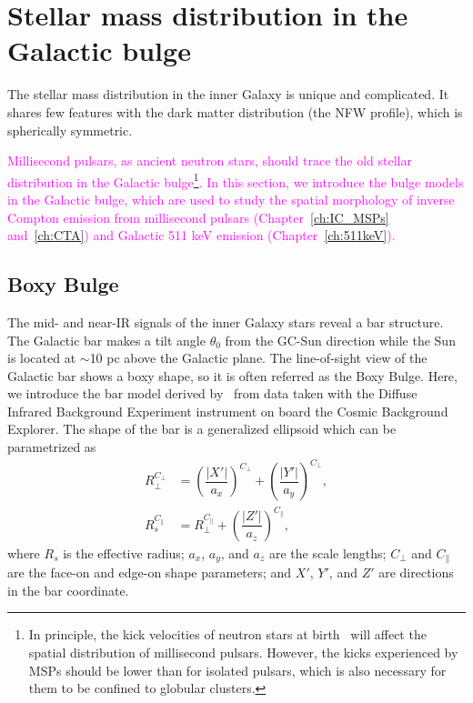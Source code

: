 \documentclass[doublespace,nopageskip]{VTthesis} %
\newcommand{\DS}[1]{\textcolor{magenta}{#1}}
\begin{document}
\section{Stellar mass distribution in the Galactic bulge}\label{se:bulge_model}

The stellar mass distribution in the inner Galaxy is unique and complicated. It shares few features with the dark matter distribution (the NFW profile), which is spherically symmetric.

\DS{
Millisecond pulsars, as ancient neutron stars, should trace the old stellar distribution in the Galactic bulge\footnote{In principle, the kick velocities of neutron stars at birth~\cite{2018ApJ...862...79E} will affect the spatial distribution of millisecond pulsars. However, the kicks experienced by MSPs should be lower than for isolated pulsars, which is also necessary for them to be confined to globular clusters.}. In this section, we introduce the bulge models in the Galactic bulge, which are used to study the spatial morphology of inverse Compton emission from millisecond pulsars (Chapter~\ref{ch:IC_MSPs} and~\ref{ch:CTA}) and Galactic 511 keV emission (Chapter~\ref{ch:511keV}).
}

\subsection{Boxy Bulge}

The mid- and near-IR signals of the inner Galaxy stars reveal a bar structure. The Galactic bar makes a tilt angle $\theta_0$ from the GC-Sun direction while the Sun is located at $\sim$10 pc above the Galactic plane. The line-of-sight view of the Galactic bar shows a boxy shape, so it is often referred as the Boxy Bulge. Here, we introduce the bar model derived by~\citet{1998ApJ...492..495F} from data taken with the Diffuse Infrared Background Experiment instrument on board the Cosmic Background Explorer. The shape of the bar is a generalized ellipsoid which can be parametrized as
\begin{align}\label{eq:Rs}
  R_{\perp}^{C_{\perp}} &= \left(\dfrac{|X'|}{a_x}\right)^{C_{\perp}} + \left(\dfrac{|Y'|}{a_y}\right)^{C_{\perp}},\\
  R_s^{C_{\parallel}} &= R_{\perp}^{C_{\parallel}} + \left(\dfrac{|Z'|}{a_z}\right)^{C_{\parallel}},
\end{align}
where $R_s$ is the effective radius; $a_x$, $a_y$, and $a_z$ are the scale lengths; $C_\perp$ and $C_\parallel$ are the face-on and edge-on shape parameters; and $X'$, $Y'$, and $Z'$
are directions in the bar
coordinate. 
\end{document}
